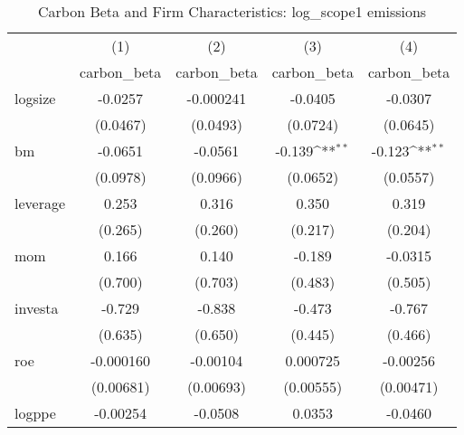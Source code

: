 \begin{table}[htbp]\centering
\def\sym#1{\ifmmode^{#1}\else\(^{#1}\)\fi}
\caption{Carbon Beta and Firm Characteristics: log\_scope1 emissions}
\begin{tabular}{l*{4}{c}}
\hline\hline
                    &\multicolumn{1}{c}{(1)}&\multicolumn{1}{c}{(2)}&\multicolumn{1}{c}{(3)}&\multicolumn{1}{c}{(4)}\\
                    &\multicolumn{1}{c}{carbon\_beta}&\multicolumn{1}{c}{carbon\_beta}&\multicolumn{1}{c}{carbon\_beta}&\multicolumn{1}{c}{carbon\_beta}\\
\hline
logsize             &     -0.0257         &   -0.000241         &     -0.0405         &     -0.0307         \\
                    &    (0.0467)         &    (0.0493)         &    (0.0724)         &    (0.0645)         \\
[1em]
bm                  &     -0.0651         &     -0.0561         &      -0.139\sym{**} &      -0.123\sym{**} \\
                    &    (0.0978)         &    (0.0966)         &    (0.0652)         &    (0.0557)         \\
[1em]
leverage            &       0.253         &       0.316         &       0.350         &       0.319         \\
                    &     (0.265)         &     (0.260)         &     (0.217)         &     (0.204)         \\
[1em]
mom                 &       0.166         &       0.140         &      -0.189         &     -0.0315         \\
                    &     (0.700)         &     (0.703)         &     (0.483)         &     (0.505)         \\
[1em]
investa             &      -0.729         &      -0.838         &      -0.473         &      -0.767         \\
                    &     (0.635)         &     (0.650)         &     (0.445)         &     (0.466)         \\
[1em]
roe                 &   -0.000160         &    -0.00104         &    0.000725         &    -0.00256         \\
                    &   (0.00681)         &   (0.00693)         &   (0.00555)         &   (0.00471)         \\
[1em]
logppe              &    -0.00254         &     -0.0508         &      0.0353         &     -0.0460         \\

\end{tabular}
\end{table}
